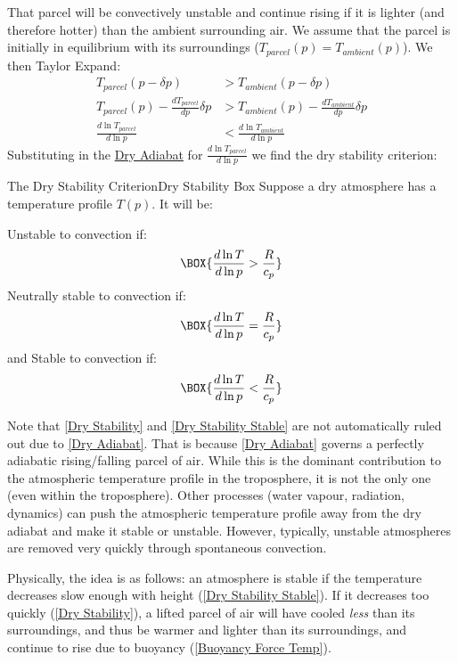 That parcel will be convectively unstable and continue rising if it is lighter (and therefore hotter) than the ambient surrounding air. We assume that the parcel is initially in equilibrium with its surroundings ($T_{parcel}(p)=T_{ambient}(p)$). We then Taylor Expand:
\begin{align*}
    T_{parcel}(p-\delta p)&>T_{ambient}(p-\delta p)\\
    {T_{parcel}(p)}-\frac{d T_{parcel}}{d p}\delta p & >T_{ambient}(p)-\frac{d T_{ambient}}{d p}\delta p\\
    \frac{d \ln T_{parcel}}{d \ln p} & <\frac{d \ln T_{ambient}}{d \ln p}
\end{align*}
Substituting in the \hyperref[Dry Adiabat]{Dry Adiabat} for $\frac{d \ln T_{parcel}}{d \ln p}$ we find the dry stability criterion:
\begin{fact}{The Dry Stability Criterion}{Dry Stability Box}\label{Dry Stability Box}
Suppose a dry atmosphere has a temperature profile $T(p)$. It will be:
\begin{multicols}{3}
    \centering
    Unstable to convection if:\newline
    \begin{align}\label{Dry Stability}
        \BOX{\frac{d\ln T}{d\ln p}>\frac{R}{c_p}}
    \end{align}
    Neutrally stable to convection if:
    \begin{align}
        \BOX{\frac{d\ln T}{d\ln p}=\frac{R}{c_p}}
    \end{align}
    and Stable to convection if:
    \begin{align}\label{Dry Stability Stable}
        \BOX{\frac{d\ln T}{d\ln p}<\frac{R}{c_p}}
    \end{align}
\end{multicols}
\end{fact}
Note that \ref{Dry Stability} and \ref{Dry Stability Stable} are not automatically ruled out due to \ref{Dry Adiabat}. That is because \ref{Dry Adiabat} governs a perfectly adiabatic rising/falling parcel of air. While this is the dominant contribution to the atmospheric temperature profile in the troposphere,  it is not the only one (even within the troposphere). Other processes (water vapour, radiation, dynamics) can push the atmospheric temperature profile away from the dry adiabat and make it stable or unstable. However, typically, unstable atmospheres are removed very quickly through spontaneous convection.

Physically, the idea is as follows: an atmosphere is stable if the temperature decreases slow enough with height (\ref{Dry Stability Stable}). If it decreases too quickly (\ref{Dry Stability}), a lifted parcel of air will have cooled \textit{less} than its surroundings, and thus be warmer and lighter than its surroundings, and continue to rise due to buoyancy (\ref{Buoyancy Force Temp}).

